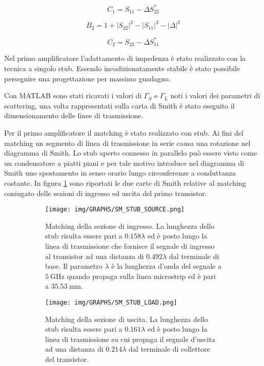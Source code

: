 \documentclass[12pt,oneside]{book}
\begin{document}
\begin{equation}
    C_{1} = S_{11} - \Delta S_{22}^{*}
\end{equation}

\begin{equation}
    B_{2} = 1 + \left|S_{22}\right|^{2} - \left|S_{11}\right|^{2} -\left|\Delta\right|^{2}
\end{equation}

\begin{equation}
    C_{2} = S_{22} - \Delta S_{11}^{*}
\end{equation}



Nel primo amplificatore l'adattamento di impedenza è stato realizzato con la tecnica a singolo stub. Essendo incodizionatamente stabile è stato possibile perseguire una progettazione per massimo guadagno.

Con MATLAB sono stati ricavati i valori di $\Gamma_{S}$ e $\Gamma_{L}$ noti i valori dei parametri di scattering, una volta rappresentati sulla carta di Smith è stato eseguito il dimensionamento delle linee di trasmissione. 

Per il primo amplificatore il matching è stato realizzato con stub. Ai fini del matching un segmento di linea di trasmissione in serie causa una rotazione nel diagramma di Smith. Lo stub aperto connesso in parallelo può essere visto come un condensatore a piatti piani e per tale motivo introduce nel diagramma di Smith uno spostamento in senso orario lungo circonferenze a conduttanza costante. In figura \ref{stub_match} sono riportati le due carte di Smith relative al matching coniugato delle sezioni di ingresso ed uscita del primo transistor.
\begin{figure}[!htbp]
    \centering
    \begin{subfigure}[t]{0.48\textwidth}
        \centering
        \texttt{[image: img/GRAPHS/SM\_STUB\_SOURCE.png]}
        \caption{Matching della sezione di ingresso. La lunghezza dello stub risulta essere pari a $0.158\lambda$ ed è posto lungo la linea di trasmissione che fornisce il segnale di ingresso al transistor ad una distanza di $0.492\lambda$ dal terminale di base. Il parametro $\lambda$ è la lunghezza d'onda del segnale a $\SI{5}{\giga\hertz}$ quando propaga sulla linea microstrip ed è pari a $\SI{35.53}{\milli\meter}$.}
    \end{subfigure}
    \hfill
    \begin{subfigure}[t]{0.48\textwidth}
        \centering
        \texttt{[image: img/GRAPHS/SM\_STUB\_LOAD.png]}
        \caption{Matching della sezione di uscita. La lunghezza dello stub risulta essere pari a $0.161\lambda$ ed è posto lungo la linea di trasmissione su cui propaga il segnale d'uscita ad una distanza di $0.214\lambda$ dal terminale di collettore del transistor.}
    \end{subfigure}
    \caption{}
    \label{stub_match}
\end{figure}
\end{document}
